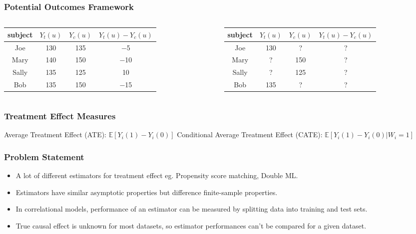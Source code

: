 \documentclass{beamer}
\begin{document}
\begin{frame}
	\frametitle{Potential Outcomes Framework}
	\begin{columns}
		\begin{column}{0.5 \textwidth}
		\begin{table}
			\centering
			\begin{tabularx}{\textwidth}{| c | c | c | c |} 
			\hline 
			\textbf{subject} & $ Y_{t}(u) $  & $ Y_{c}(u) $ & $ Y_{t}(u) - Y_{c}(u) $ \\
			\hline
				Joe    & 130     & 135    & −5 \\
				Mary   & 140     & 150    & −10 \\
				Sally  & 135     & 125    & 10 \\
				Bob    & 135     & 150    & −15 \\
			\hline
			\hline
			\end{tabularx}
		\end{table}
		\end{column}
		\begin{column}{0.5 \textwidth}
		\begin{table}
			\centering
			\begin{tabularx}{\textwidth}{| c | c | c | c |} 
			\hline 
			\textbf{subject} & $ Y_{t}(u) $  & $ Y_{c}(u) $ & $ Y_{t}(u) - Y_{c}(u) $ \\
			\hline
				Joe    & 130     & ? & ? \\
				Mary   & ? & 150    &  ? \\
				Sally  & ? & 125    &  ? \\
				Bob    & 135     & ? & ? \\
			\hline
			\hline
			\end{tabularx}
		\end{table}
		\end{column}
	\end{columns}	
\end{frame}

\begin{frame}
	\frametitle{Treatment Effect Measures}
	Average Treatment Effect (ATE):
	$ \mathbb{E}[Y_i(1) - Y_i(0)] $
	Conditional Average Treatment Effect (CATE):
	$ \mathbb{E}[Y_i(1) - Y_i(0) | W_i = 1] $
\end{frame}

\begin{frame}
	\frametitle{Problem Statement}
	\begin{itemize}
		\item A lot of different estimators for treatment effect eg. Propensity score matching, Double ML.
		\item Estimators have similar asymptotic properties but difference finite-sample properties.
		\item In correlational models, performance of an estimator can be measured by
			splitting data into training and test sets.
		\item True causal effect is unknown for most datasets, so estimator performances
			can't be compared for a given dataset.
	\end{itemize}
\end{frame}
\end{document}
